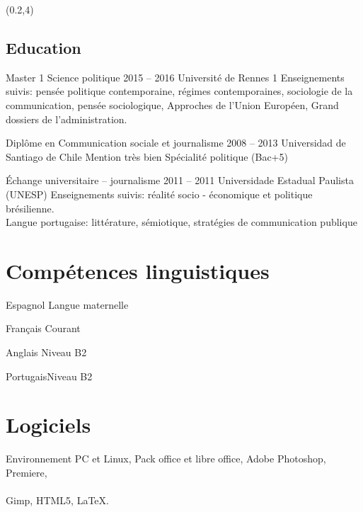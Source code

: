 \documentclass{tccv}
\begin{document}
\begin{textblock}{7}(0.2,4)
\begin{mdframed}

\section{Education}
\begin{yearlist}

\item[Master 1 Science politique]{2015 -- 2016}
     {Université de Rennes 1}
     {Enseignements suivis: pensée politique contemporaine, 
     régimes contemporaines, sociologie de la communication, pensée sociologique, Approches de l'Union Européen, Grand dossiers de l'administration.}


  

\item[Diplôme en Communication sociale et journalisme]{2008 -- 2013}
     {Universidad de Santiago de Chile}
     {Mention très bien
      Spécialité politique
      (Bac+5)}

     
\item[Échange universitaire -- journalisme]{2011 -- 2011}
     {Universidade Estadual Paulista (UNESP)}
     {Enseignements suivis: réalité socio - économique et politique brésilienne. \\
     Langue portugaise: littérature, sémiotique, stratégies de communication publique}


\end{yearlist}
\end{mdframed}


\begin{mdframed}
\section{Compétences linguistiques}

\begin{factlist}
\item{Espagnol} {Langue maternelle}	
\item{Français} {Courant}	
\item{Anglais}  {Niveau B2}	
\item{Portugais}{Niveau B2}
\end{factlist}

\section{Logiciels}

Environnement PC et Linux,
Pack office et libre office,
Adobe Photoshop, Premiere, \\
 \\
Gimp,
HTML5,
\LaTeX.

\end{mdframed}
\end{textblock}
\end{document}

